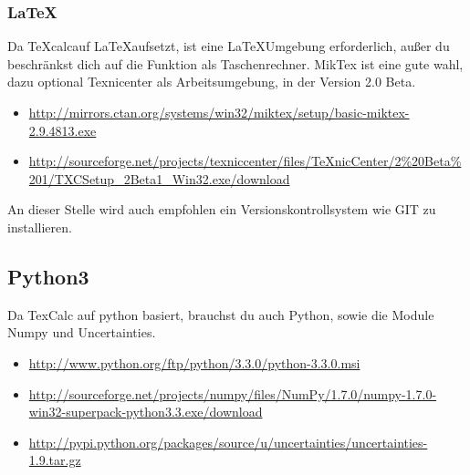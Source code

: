 \documentclass[a4paper]{article}
\newcommand{\texcalc}{{\TeX}calc}
\begin{document}
\subsubsection{\LaTeX}

Da \texcalc auf \LaTeX aufsetzt, ist eine \LaTeX Umgebung erforderlich, außer du beschränkst
dich auf die Funktion als Taschenrechner. MikTex ist eine gute wahl, dazu optional Texnicenter
als Arbeitsumgebung, in der Version 2.0 Beta.

\begin{itemize}
\item \url{http://mirrors.ctan.org/systems/win32/miktex/setup/basic-miktex-2.9.4813.exe}
\item \url{http://sourceforge.net/projects/texniccenter/files/TeXnicCenter/2%20Beta%201/TXCSetup_2Beta1_Win32.exe/download}
\end{itemize}

An dieser Stelle wird auch empfohlen ein Versionskontrollsystem wie GIT zu installieren.

%
%
%

\subsection{Python3}

Da TexCalc auf python basiert, brauchst du auch Python, sowie die Module
Numpy und Uncertainties.

\begin{itemize}
\item \url{http://www.python.org/ftp/python/3.3.0/python-3.3.0.msi}
\item \url{http://sourceforge.net/projects/numpy/files/NumPy/1.7.0/numpy-1.7.0-win32-superpack-python3.3.exe/download}
\item \url{http://pypi.python.org/packages/source/u/uncertainties/uncertainties-1.9.tar.gz}
\end{itemize}
\end{document}
